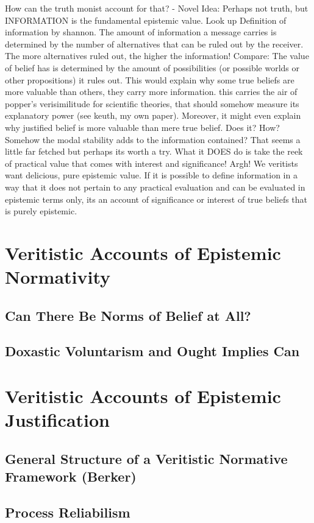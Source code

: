\documentclass[12pt,numbers=noenddot]{scrartcl}
\begin{document}
    How can the truth monist account for that? - Novel Idea: Perhaps not truth, but INFORMATION is the fundamental epistemic value. Look up Definition of information by shannon. The amount of information a message carries is determined by the number of alternatives that can be ruled out by the receiver. The more alternatives ruled out, the higher the information! Compare: The value of belief has is determined by the amount of possibilities (or possible worlds or other propositions) it rules out. This would explain why some true beliefs are more valuable than others, they carry more information. this carries the air of popper's verisimilitude for scientific theories, that should somehow measure its explanatory power (see keuth, my own paper).
    Moreover, it might even explain why justified belief is more valuable than mere true belief. Does it? How? Somehow the modal stability adds to the information contained? That seems a little far fetched but perhaps its worth a try. 
    What it DOES do is take the reek of practical value that comes with interest and significance! Argh! We veritists want delicious, pure epistemic value. If it is possible to define information in a way that it does not pertain to any practical evaluation and can be evaluated in epistemic terms only, its an account of significance or interest of true beliefs that is purely epistemic.

\section{Veritistic Accounts of Epistemic Normativity}
\subsection{Can There Be Norms of Belief at All?}
    \subsection{Doxastic Voluntarism and Ought Implies Can}

\section{Veritistic Accounts of Epistemic Justification}
\subsection{General Structure of a Veritistic Normative Framework (Berker)}
\subsection{Process Reliabilism}
\end{document}
